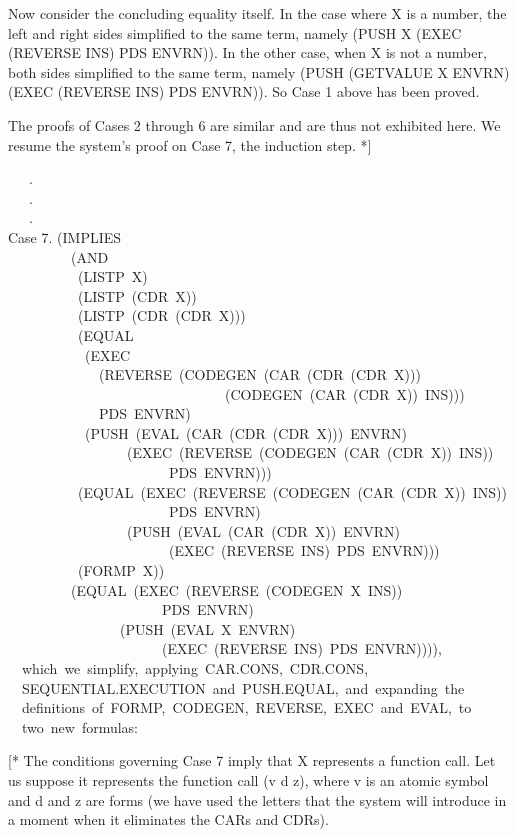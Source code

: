 \documentclass[10pt]{book}
\newenvironment{pubasis}{\begin{flushleft}}{\end{flushleft}}
\begin{document}
Now consider the concluding equality itself.  In the case where X is
a number, the left and right sides simplified to the same term, namely
(PUSH X (EXEC (REVERSE INS) PDS ENVRN)).  In the other case,
when X is not a number, both sides simplified to the same term,
namely (PUSH (GETVALUE X ENVRN) (EXEC (REVERSE INS) PDS ENVRN)).  So Case 1
above has been proved.

The proofs of Cases 2 through 6 are similar and are thus not
exhibited here.  We resume the system's proof on Case 7, the induction step. *]

\begin{pubasis}
~~~.\\
~~~.\\
~~~.\\

Case 7.	(IMPLIES\\
~~~~~~~~~(AND\\
~~~~~~~~~~(LISTP~X)\\
~~~~~~~~~~(LISTP~(CDR~X))\\
~~~~~~~~~~(LISTP~(CDR~(CDR~X)))\\
~~~~~~~~~~(EQUAL\\
~~~~~~~~~~~(EXEC\\
~~~~~~~~~~~~~(REVERSE~(CODEGEN~(CAR~(CDR~(CDR~X)))\\
~~~~~~~~~~~~~~~~~~~~~~~~~~~~~~~(CODEGEN~(CAR~(CDR~X))~INS)))\\
~~~~~~~~~~~~~PDS~ENVRN)\\
~~~~~~~~~~~(PUSH~(EVAL~(CAR~(CDR~(CDR~X)))~ENVRN)\\
~~~~~~~~~~~~~~~~~(EXEC~(REVERSE~(CODEGEN~(CAR~(CDR~X))~INS))\\
~~~~~~~~~~~~~~~~~~~~~~~PDS~ENVRN)))\\
~~~~~~~~~~(EQUAL~(EXEC~(REVERSE~(CODEGEN~(CAR~(CDR~X))~INS))\\
~~~~~~~~~~~~~~~~~~~~~~~PDS~ENVRN)\\
~~~~~~~~~~~~~~~~~(PUSH~(EVAL~(CAR~(CDR~X))~ENVRN)\\
~~~~~~~~~~~~~~~~~~~~~~~(EXEC~(REVERSE~INS)~PDS~ENVRN)))\\
~~~~~~~~~~(FORMP~X))\\
~~~~~~~~~(EQUAL~(EXEC~(REVERSE~(CODEGEN~X~INS))\\
~~~~~~~~~~~~~~~~~~~~~~PDS~ENVRN)\\
~~~~~~~~~~~~~~~~(PUSH~(EVAL~X~ENVRN)\\
~~~~~~~~~~~~~~~~~~~~~~(EXEC~(REVERSE~INS)~PDS~ENVRN)))),\\

~~which~we~simplify,~applying~CAR.CONS,~CDR.CONS,\\
~~SEQUENTIAL.EXECUTION~and~PUSH.EQUAL,~and~expanding~the\\
~~definitions~of~FORMP,~CODEGEN,~REVERSE,~EXEC~and~EVAL,~to\\
~~two~new~formulas:\\
\end{pubasis}
[* The conditions governing Case 7 imply that X represents a function call.
Let us suppose it represents the function call (v d z), where v
is an atomic symbol and d and z are forms (we have used the
letters that the system will introduce in a moment when it
eliminates the CARs and CDRs).
\end{document}

